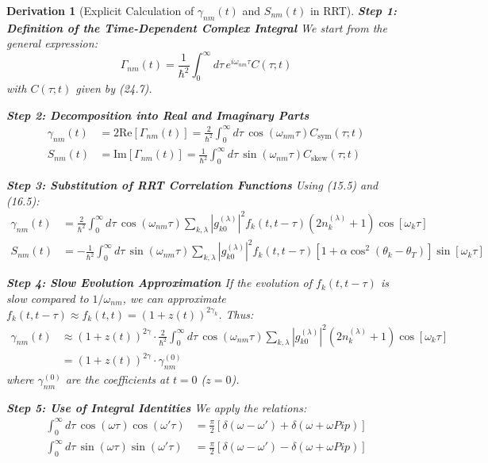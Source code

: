 \documentclass[10pt, a4paper]{article}
\newtheorem{derivation}{Derivation}
\begin{document}
\begin{derivation}[Explicit Calculation of $\gamma_{nm}(t)$ and $S_{nm}(t)$ in RRT]
\textbf{Step 1: Definition of the Time-Dependent Complex Integral}
We start from the general expression:
\begin{equation}
\Gamma_{nm}(t) = \frac{1}{\hbar^2} \int_0^\infty d\tau \, e^{i\omega_{nm}\tau} C(\tau; t)
\tag{26.1}
\end{equation}
with $C(\tau; t)$ given by (24.7).

\textbf{Step 2: Decomposition into Real and Imaginary Parts}
\begin{align}
\gamma_{nm}(t) &= 2\text{Re}[\Gamma_{nm}(t)] = \frac{2}{\hbar^2} \int_0^\infty d\tau \, \cos(\omega_{nm}\tau) C_{\text{sym}}(\tau; t)
\tag{26.2} \\
S_{nm}(t) &= \text{Im}[\Gamma_{nm}(t)] = \frac{1}{\hbar^2} \int_0^\infty d\tau \, \sin(\omega_{nm}\tau) C_{\text{skew}}(\tau; t)
\tag{26.3}
\end{align}

\textbf{Step 3: Substitution of RRT Correlation Functions}
Using (15.5) and (16.5):
\begin{align}
\gamma_{nm}(t) &= \frac{2}{\hbar^2} \int_0^\infty d\tau \, \cos(\omega_{nm}\tau) \sum_{k,\lambda} |g_{k0}^{(\lambda)}|^2 f_k(t, t-\tau) (2n_k^{(\lambda)}+1) \cos[\omega_k \tau]
\tag{26.4} \\
S_{nm}(t) &= -\frac{1}{\hbar^2} \int_0^\infty d\tau \, \sin(\omega_{nm}\tau) \sum_{k,\lambda} |g_{k0}^{(\lambda)}|^2 f_k(t, t-\tau) [1+\alpha\cos^2(\theta_k-\theta_T)] \sin[\omega_k \tau]
\tag{26.5}
\end{align}

\textbf{Step 4: Slow Evolution Approximation}
If the evolution of $f_k(t, t-\tau)$ is slow compared to $1/\omega_{nm}$, we can approximate $f_k(t, t-\tau) \approx f_k(t, t) = (1+z(t))^{2\gamma_k}$. Thus:
\begin{align}
\gamma_{nm}(t) &\approx (1+z(t))^{2\gamma} \cdot \frac{2}{\hbar^2} \int_0^\infty d\tau \, \cos(\omega_{nm}\tau) \sum_{k,\lambda} |g_{k0}^{(\lambda)}|^2 (2n_k^{(\lambda)}+1) \cos[\omega_k \tau]
\tag{26.6} \\
&= (1+z(t))^{2\gamma} \cdot \gamma_{nm}^{(0)}
\end{align}
where $\gamma_{nm}^{(0)}$ are the coefficients at $t=0$ ($z=0$).

\textbf{Step 5: Use of Integral Identities}
We apply the relations:
\begin{align}
\int_0^\infty d\tau \, \cos(\omega\tau)\cos(\omega'\tau) &= \frac{\pi}{2} [\delta(\omega-\omega') + \delta(\omega+\omega Pip)]
\tag{26.7} \\
\int_0^\infty d\tau \, \sin(\omega\tau)\sin(\omega'\tau) &= \frac{\pi}{2} [\delta(\omega-\omega') - \delta(\omega+\omega Pip)]
\tag{26.8}
\end{align}


\end{derivation}
\end{document}
